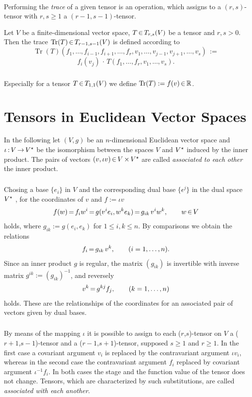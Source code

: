 \documentclass[11pt,twoside]{article}
\begin{document}
\paragraph{}
Performing the \textit{trace} of a given tensor is an operation,
which assigns to a $(r,s)$-tensor with $r,s \geq 1$
a $(r-1,s-1)$-tensor.

\begin{definition}
Let $V$ be a finite-dimensional vector space,
$T {\,\in\,} T_{r,s}(V)$ be a tensor and $r,s > 0$.
Then the trace $\operatorname{Tr}(T) {\,\in\,} T_{r-1,s-1}(V)$
is defined according to
\[
\operatorname{Tr}(T)(f_1,\ldots,f_{i-1},f_{i+1},\ldots,f_r,
                     v_1,\ldots,v_{j-1},v_{j+1},\ldots,v_s) \, := 
\]
\[
f_i(v_j) \, \cdot \, T(f_1,\ldots,f_r,v_1,\ldots,v_s).
\]
\end{definition}

\subparagraph{}
Especially for a tensor $T {\,\in\,} T_{1,1}(V)$ we define
$\operatorname{Tr}(T) := f(v) {\,\in\,} {\mathbb{R}}$.

\section{Tensors in Euclidean Vector Spaces}
In the following
let $(V,g)$ be an $n$-dimensional Euclidean vector space 
and $\iota {\,:\,} V {\,\to\,} V^\star$ be the isomorphism between the spaces $V$ and $V^\star$
induced by the inner product.
The pairs of vectors $(v, \iota v) {\,\in\,} V {\,\times\,} V^\star$ 
are called \textit{associated to each other} {\wrt} the inner product.

\subparagraph{}
Chosing a base $\{e_i\}$ in $V$ and
the corresponding dual base $\{\epsilon^j\}$ in the dual space ${V^\star}$ ,
for the coordinates of $v$ and $f := \iota v$
\[
f(w) {\,=\,} f_i w^i {\,=\,} g(v^i e_i, w^k e_k) {\,=\,} g_{ik} \,
v^i w^k, \qquad w {\,\in\,} V
\]
holds,
where $g_{ik} := g(e_i,e_k)$ for $1 \leq i,k \leq n$.
By comparisons we obtain the relations
\[
f_i {\,=\,} g_{ik} \, v^k, \qquad (i=1,\ldots,n).
\]
Since an inner product $g$ is regular,
the matrix $(g_{ik})$ is invertible with inverse matrix
$g^{ik} := (g_{ik})^{-1}$,
and reversely
\[
v^k {\,=\,} g^{kj} f_j, \qquad (k=1,\ldots,n)
\]
holds.
These are the relationships of the coordinates for an associated pair
of vectors {\wrt} given by dual bases.

\subparagraph{}
By means of the mapping $\iota$
it is possible to assign to each ($r$,$s$)-tensor on $V$ a ($r+1$,$s-1$)-tensor
and a ($r-1$,$s+1$)-tensor,
supposed $s \geq 1$ and $r \geq 1$.
In the first case a covariant argument $v_i$ is replaced by
the contravariant argument $\iota v_i$, 
whereas in the second case the contravariant argument $f_i$ replaced
by covariant argument $\iota^{-1} f_i$. 
In both cases the stage and the function value of the tensor does not change.
Tensors,
which are characterized by such substitutions,
are called \textit{associated with each another}.
\end{document}
